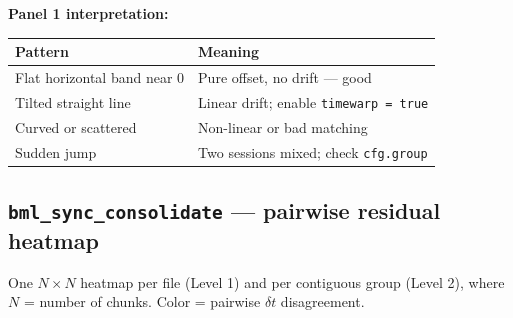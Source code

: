 \documentclass[11pt, a4paper]{article}
\begin{document}
\textbf{Panel 1 interpretation:}

\begin{center}
\renewcommand{\arraystretch}{1.3}
\begin{tabular}{p{5.5cm}p{8cm}}
\toprule
\textbf{Pattern} & \textbf{Meaning} \\
\midrule
Flat horizontal band near 0 & Pure offset, no drift --- good \\
Tilted straight line & Linear drift; enable \texttt{timewarp = true} \\
Curved or scattered & Non-linear or bad matching \\
Sudden jump & Two sessions mixed; check \texttt{cfg.group} \\
\bottomrule
\end{tabular}
\end{center}

\subsection{\texttt{bml\_sync\_consolidate} --- pairwise residual heatmap}

One $N \times N$ heatmap per file (Level 1) and per contiguous group (Level 2), where $N$ = number of chunks. Color = pairwise $\delta t$ disagreement.
\end{document}
